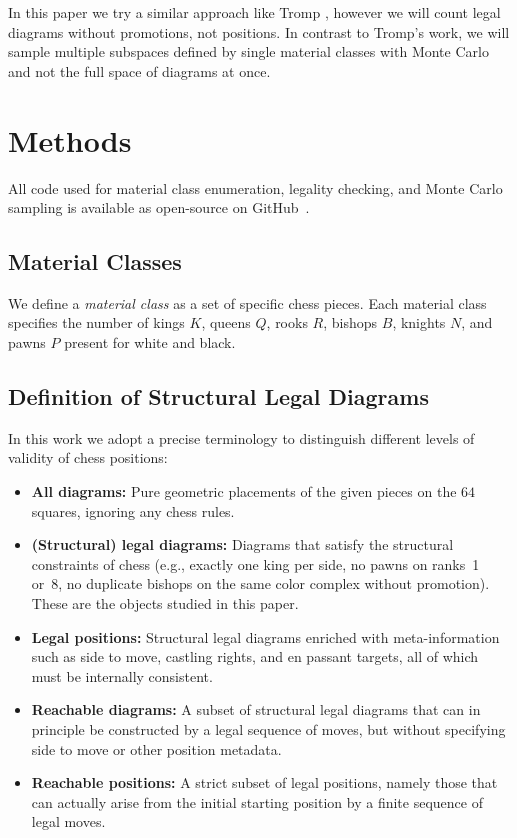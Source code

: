 \documentclass[12pt]{article}
\begin{document}
In this paper we try a similar approach like Tromp \cite{tromp2021b}, however we will count legal diagrams without promotions, not positions. In contrast to Tromp's work, we will sample multiple subspaces defined by single material classes with Monte Carlo and not the full space of diagrams at once.


\section{Methods}
All code used for material class enumeration, legality checking, and Monte Carlo sampling 
is available as open-source on GitHub~\cite{repo}.

\subsection{Material Classes}

We define a \emph{material class} as a set of specific chess pieces. Each material class specifies the number of kings $K$, queens $Q$, rooks $R$, bishops $B$, knights $N$, and pawns $P$ present for white and black.

\subsection{Definition of Structural Legal Diagrams}

In this work we adopt a precise terminology to distinguish different levels of validity of chess positions:

\begin{itemize}
    \item \textbf{All diagrams:} Pure geometric placements of the given pieces on the $64$ squares, ignoring any chess rules.
    \item \textbf{(Structural) legal diagrams:} Diagrams that satisfy the structural constraints of chess (e.g., exactly one king per side, no pawns on ranks~1 or~8, no duplicate bishops on the same color complex without promotion). These are the objects studied in this paper.
    \item \textbf{Legal positions:} Structural legal diagrams enriched with meta-information such as side to move, castling rights, and en passant targets, all of which must be internally consistent.
    \item \textbf{Reachable diagrams:} A subset of structural legal diagrams that can in principle be constructed by a legal sequence of moves, but without specifying side to move or other position metadata.
    \item \textbf{Reachable positions:} A strict subset of legal positions, namely those that can actually arise from the initial starting position by a finite sequence of legal moves.
\end{itemize}
\end{document}
